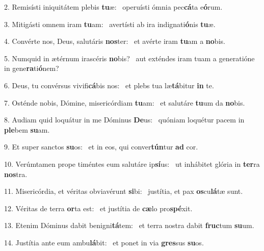 2. Remisísti iniquitátem plebis \textbf{tu}æ: \ast\  operuísti ómnia pec\textbf{cá}ta e\textbf{ó}rum.\

3. Mitigásti omnem iram \textbf{tu}am: \ast\  avertísti ab ira indignati\textbf{ó}nis \textbf{tu}æ.\

4. Convérte nos, Deus, salutáris \textbf{nos}ter: \ast\  et avérte iram \textbf{tu}am a \textbf{no}bis.\

5. Numquid in ætérnum irascéris \textbf{no}bis? \ast\  aut exténdes iram tuam a generatióne in gene\textbf{ra}ti\textbf{ó}nem?\

6. Deus, tu convérsus vivifi\textbf{cá}bis nos: \ast\  et plebs tua læ\textbf{tá}bitur \textbf{in} te.\

7. Osténde nobis, Dómine, misericórdiam \textbf{tu}am: \ast\  et salutáre \textbf{tu}um da \textbf{no}bis.\

8. Audiam quid loquátur in me Dóminus \textbf{De}us: \ast\  quóniam loquétur pacem in \textbf{ple}bem \textbf{su}am.\

9. Et super sanctos \textbf{su}os: \ast\  et in eos, qui conver\textbf{tún}tur \textbf{ad} cor.\

10. Verúmtamen prope timéntes eum salutáre ip\textbf{sí}us: \ast\  ut inhábitet glória in \textbf{ter}ra \textbf{nos}tra.\

11. Misericórdia, et véritas obviavérunt \textbf{si}bi: \ast\  justítia, et pax \textbf{os}cu\textbf{lá}tæ sunt.\

12. Véritas de terra \textbf{or}ta est: \ast\  et justítia de \textbf{cæ}lo pro\textbf{spé}xit.\

13. Etenim Dóminus dabit benigni\textbf{tá}tem: \ast\  et terra nostra dabit \textbf{fruc}tum \textbf{su}um.\

14. Justítia ante eum ambu\textbf{lá}bit: \ast\  et ponet in via \textbf{gres}sus \textbf{su}os.\

